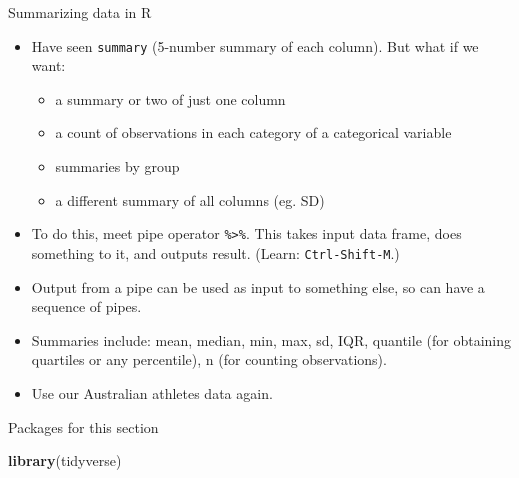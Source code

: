 \documentclass[
  ignorenonframetext,
]{beamer}
\newenvironment{Shaded}{\begin{snugshade}}{\end{snugshade}}
\newcommand{\KeywordTok}[1]{\textcolor[rgb]{0.13,0.29,0.53}{\textbf{#1}}}
\newcommand{\NormalTok}[1]{#1}
\providecommand{\tightlist}{%
  \setlength{\itemsep}{0pt}\setlength{\parskip}{0pt}}
\begin{document}
\begin{frame}[fragile]{Summarizing data in R}
\protect\hypertarget{summarizing-data-in-r}{}

\begin{itemize}
\tightlist
\item
  Have seen \texttt{summary} (5-number summary of each column). But what
  if we want:

  \begin{itemize}
  \tightlist
  \item
    a summary or two of just one column
  \item
    a count of observations in each category of a categorical variable
  \item
    summaries by group
  \item
    a different summary of all columns (eg. SD)
  \end{itemize}
\item
  To do this, meet pipe operator \texttt{\%\textgreater{}\%}. This takes
  input data frame, does something to it, and outputs result. (Learn:
  \texttt{Ctrl-Shift-M}.)
\item
  Output from a pipe can be used as input to something else, so can have
  a sequence of pipes.
\item
  Summaries include: mean, median, min, max, sd, IQR, quantile (for
  obtaining quartiles or any percentile), n (for counting observations).
\item
  Use our Australian athletes data again.
\end{itemize}

\end{frame}

\begin{frame}[fragile]{Packages for this section}
\protect\hypertarget{packages-for-this-section-2}{}

\begin{Shaded}
\begin{Highlighting}[]
\KeywordTok{library}\NormalTok{(tidyverse)}
\end{Highlighting}
\end{Shaded}

\end{frame}
\end{document}
